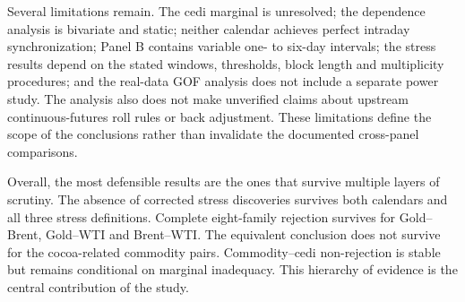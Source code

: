 Several limitations remain. The cedi marginal is unresolved; the dependence analysis is bivariate and static; neither calendar achieves perfect intraday synchronization; Panel B contains variable one- to six-day intervals; the stress results depend on the stated windows, thresholds, block length and multiplicity procedures; and the real-data GOF analysis does not include a separate power study. The analysis also does not make unverified claims about upstream continuous-futures roll rules or back adjustment. These limitations define the scope of the conclusions rather than invalidate the documented cross-panel comparisons.

Overall, the most defensible results are the ones that survive multiple layers of scrutiny. The absence of corrected stress discoveries survives both calendars and all three stress definitions. Complete eight-family rejection survives for Gold--Brent, Gold--WTI and Brent--WTI. The equivalent conclusion does not survive for the cocoa-related commodity pairs. Commodity--cedi non-rejection is stable but remains conditional on marginal inadequacy. This hierarchy of evidence is the central contribution of the study.

